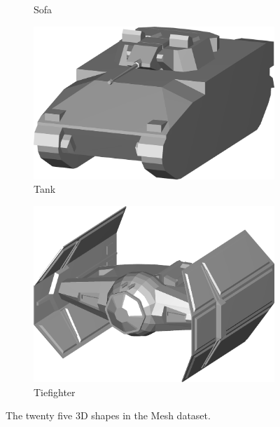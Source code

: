 \begin{figure}
\begin{subfigure}[t]{0.19\linewidth}
		\caption{Sofa} 	
	\end{subfigure}
	\begin{subfigure}[t]{0.19\linewidth} \centering
		\includegraphics[width=1\linewidth]{./fig/eval/24tank.png}  
		\caption{Tank} 	
	\end{subfigure} 
	\begin{subfigure}[t]{0.19\linewidth} \centering
		\includegraphics[width=1\linewidth]{./fig/eval/25tiefighter.png}  
		\caption{Tiefighter} 	
	\end{subfigure} 
	\caption{The twenty five 3D shapes in the Mesh dataset.}
	\label{fig/eval/sampleshapes}
\end{figure}
